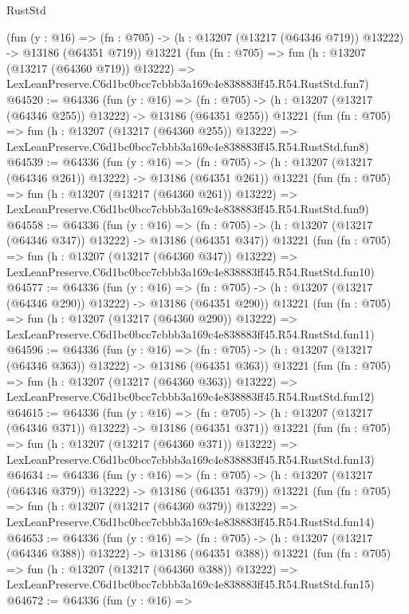 \begin{lexlean}{RustStd}
\begin{coremodule}
    (fun (y : @16) =>
    (fn : @705) -> (h : @13207 (@13217 (@64346 @719)) @13222) -> @13186 (@64351 @719))
    @13221
    (fun (fn : @705) =>
    fun (h : @13207 (@13217 (@64360 @719)) @13222) =>
    LexLeanPreserve.C6d1bc0bcc7cbbb3a169c4e838883ff45.R54.RustStd.fun7)
@64520 := @64336
    (fun (y : @16) =>
    (fn : @705) -> (h : @13207 (@13217 (@64346 @255)) @13222) -> @13186 (@64351 @255))
    @13221
    (fun (fn : @705) =>
    fun (h : @13207 (@13217 (@64360 @255)) @13222) =>
    LexLeanPreserve.C6d1bc0bcc7cbbb3a169c4e838883ff45.R54.RustStd.fun8)
@64539 := @64336
    (fun (y : @16) =>
    (fn : @705) -> (h : @13207 (@13217 (@64346 @261)) @13222) -> @13186 (@64351 @261))
    @13221
    (fun (fn : @705) =>
    fun (h : @13207 (@13217 (@64360 @261)) @13222) =>
    LexLeanPreserve.C6d1bc0bcc7cbbb3a169c4e838883ff45.R54.RustStd.fun9)
@64558 := @64336
    (fun (y : @16) =>
    (fn : @705) -> (h : @13207 (@13217 (@64346 @347)) @13222) -> @13186 (@64351 @347))
    @13221
    (fun (fn : @705) =>
    fun (h : @13207 (@13217 (@64360 @347)) @13222) =>
    LexLeanPreserve.C6d1bc0bcc7cbbb3a169c4e838883ff45.R54.RustStd.fun10)
@64577 := @64336
    (fun (y : @16) =>
    (fn : @705) -> (h : @13207 (@13217 (@64346 @290)) @13222) -> @13186 (@64351 @290))
    @13221
    (fun (fn : @705) =>
    fun (h : @13207 (@13217 (@64360 @290)) @13222) =>
    LexLeanPreserve.C6d1bc0bcc7cbbb3a169c4e838883ff45.R54.RustStd.fun11)
@64596 := @64336
    (fun (y : @16) =>
    (fn : @705) -> (h : @13207 (@13217 (@64346 @363)) @13222) -> @13186 (@64351 @363))
    @13221
    (fun (fn : @705) =>
    fun (h : @13207 (@13217 (@64360 @363)) @13222) =>
    LexLeanPreserve.C6d1bc0bcc7cbbb3a169c4e838883ff45.R54.RustStd.fun12)
@64615 := @64336
    (fun (y : @16) =>
    (fn : @705) -> (h : @13207 (@13217 (@64346 @371)) @13222) -> @13186 (@64351 @371))
    @13221
    (fun (fn : @705) =>
    fun (h : @13207 (@13217 (@64360 @371)) @13222) =>
    LexLeanPreserve.C6d1bc0bcc7cbbb3a169c4e838883ff45.R54.RustStd.fun13)
@64634 := @64336
    (fun (y : @16) =>
    (fn : @705) -> (h : @13207 (@13217 (@64346 @379)) @13222) -> @13186 (@64351 @379))
    @13221
    (fun (fn : @705) =>
    fun (h : @13207 (@13217 (@64360 @379)) @13222) =>
    LexLeanPreserve.C6d1bc0bcc7cbbb3a169c4e838883ff45.R54.RustStd.fun14)
@64653 := @64336
    (fun (y : @16) =>
    (fn : @705) -> (h : @13207 (@13217 (@64346 @388)) @13222) -> @13186 (@64351 @388))
    @13221
    (fun (fn : @705) =>
    fun (h : @13207 (@13217 (@64360 @388)) @13222) =>
    LexLeanPreserve.C6d1bc0bcc7cbbb3a169c4e838883ff45.R54.RustStd.fun15)
@64672 := @64336
    (fun (y : @16) =>

\end{coremodule}
\end{lexlean}
